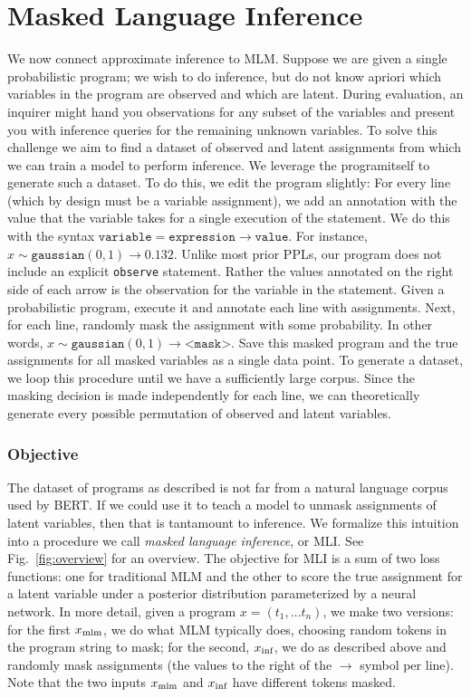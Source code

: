 \section{Masked Language Inference}
\label{sec:mli}

We now connect approximate inference to MLM. Suppose we are given a single probabilistic program; we wish to do inference, but do not know apriori which variables in the program are observed and which are latent. During evaluation, an inquirer might hand you observations for any subset of the variables and present you with inference queries for the remaining unknown variables. To solve this challenge we aim to find a dataset of observed and latent assignments from which we can train a model to perform inference. We leverage the programitself to generate such a dataset. To do this, we edit the program slightly: For every line (which by design must be a variable assignment), we add an annotation with the value that the variable takes for a single execution of the statement. We do this with the syntax $\texttt{variable} = \texttt{expression} \rightarrow \texttt{value}$. For instance, $x \sim \texttt{gaussian}(0, 1) \rightarrow 0.132$.
Unlike most prior PPLs, our program does not include an explicit \texttt{observe} statement. Rather the values annotated on the right side of each arrow is the observation for the variable in the statement.
Given a probabilistic program, execute it and annotate each line with assignments. Next, for each line, randomly mask the assignment with some probability. In other words, $x \sim \texttt{gaussian}(0, 1) \rightarrow \texttt{<mask>}$. Save this masked program and the true assignments for all masked variables as a single data point. To generate a dataset, we loop this procedure until we have a sufficiently large corpus.  Since the masking decision is made independently for each line, we can theoretically generate every possible permutation of observed and latent variables.

\subsubsection{Objective}

The dataset of programs as described is not far from a natural language corpus used by BERT. If we could use it to teach a model to unmask assignments of latent variables, then that is tantamount to inference. We formalize this intuition into a procedure we call \textit{masked language inference}, or MLI. See Fig.~\ref{fig:overview} for an overview.
The objective for MLI is a sum of two loss functions: one for traditional MLM and the other to score the true assignment for a latent variable under a posterior distribution parameterized by a neural network. In more detail, given a program $x = (t_1, \ldots t_n)$, we make two versions: for the first $x_{\textup{mlm}}$, we do what MLM typically does, choosing random tokens in the program string to mask; for the second, $x_{\textup{inf}}$, we do as described above and randomly mask assignments (the values to the right of the $\rightarrow$ symbol per line). Note that the two inputs $x_{\textup{mlm}}$ and $x_{\textup{inf}}$ have different tokens masked.

